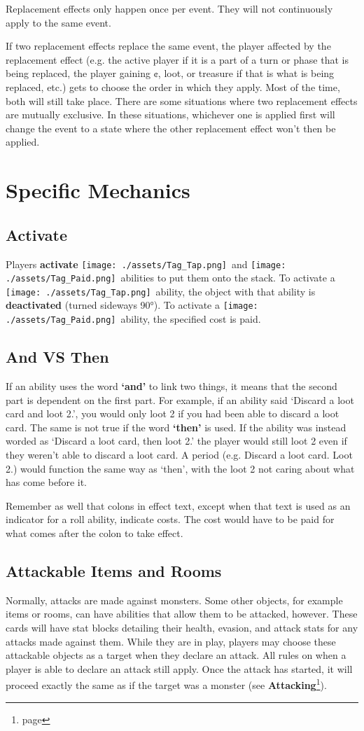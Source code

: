 \documentclass[10pt, a4paper, twoside]{article} %
\newcommand{\tap}{\texttt{[image: ./assets/Tag\_Tap.png]}}
\newcommand{\pay}{\texttt{[image: ./assets/Tag\_Paid.png]}}
\begin{document}
    Replacement effects only happen once per event. They will not continuously apply to the same event.

    If two replacement effects replace the same event, the player affected by the replacement effect (e.g. the active player if it is a part of a turn or phase that is being replaced, the player gaining ¢, loot, or treasure if that is what is being replaced, etc.) gets to choose the order in which they apply. Most of the time, both will still take place. There are some situations where two replacement effects are mutually exclusive. In these situations, whichever one is applied first will change the event to a state where the other replacement effect won’t then be applied.

    \section{Specific Mechanics}
    \label{mechanics}
    \subsection{Activate}
    Players \textbf{activate} \tap\ and \pay\ abilities to put them onto the stack. To activate a \tap\ ability, the object with that ability is \textbf{deactivated} (turned sideways 90°). To activate a \pay\ ability, the specified cost is paid.
    \subsection{And VS Then}
    If an ability uses the word \textbf{‘and’} to link two things, it means that the second part is dependent on the first part. For example, if an ability said ‘Discard a loot card and loot 2.’, you would only loot 2 if you had been able to discard a loot card. The same is not true if the word \textbf{‘then’} is used. If the ability was instead worded as ‘Discard a loot card, then loot 2.’ the player would still loot 2 even if they weren’t able to discard a loot card. A period (e.g. Discard a loot card. Loot 2.) would function the same way as ‘then’, with the loot 2 not caring about what has come before it.

    Remember as well that colons in effect text, except when that text is used as an indicator for a roll ability, indicate costs. The cost would have to be paid for what comes after the colon to take effect.
    \subsection{Attackable Items and Rooms}
    Normally, attacks are made against monsters. Some other objects, for example items or rooms, can have abilities that allow them to be attacked, however. These cards will have stat blocks detailing their health, evasion, and attack stats for any attacks made against them. While they are in play, players may choose these attackable objects as a target when they declare an attack. All rules on when a player is able to declare an attack still apply. Once the attack has started, it will proceed exactly the same as if the target was a monster (see \textbf{Attacking}\footnote{page \pageref{attacking}}).
\end{document}
